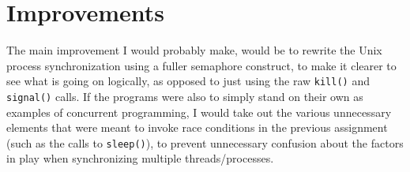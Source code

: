 \documentclass[12pt]{article}
\begin{document}


\section*{Improvements}
The main improvement I would probably make, would be to rewrite the Unix process synchronization using a fuller semaphore construct, to make it 
clearer to see what is going on logically, as opposed to just using the raw \texttt{kill()} and \texttt{signal()} calls. If the programs were also
to simply stand on their own as examples of concurrent programming, I would take out the various unnecessary elements that were meant to invoke
race conditions in the previous assignment (such as the calls to \texttt{sleep()}), to prevent unnecessary confusion about the factors in play
when synchronizing multiple threads/processes.
\end{document}
